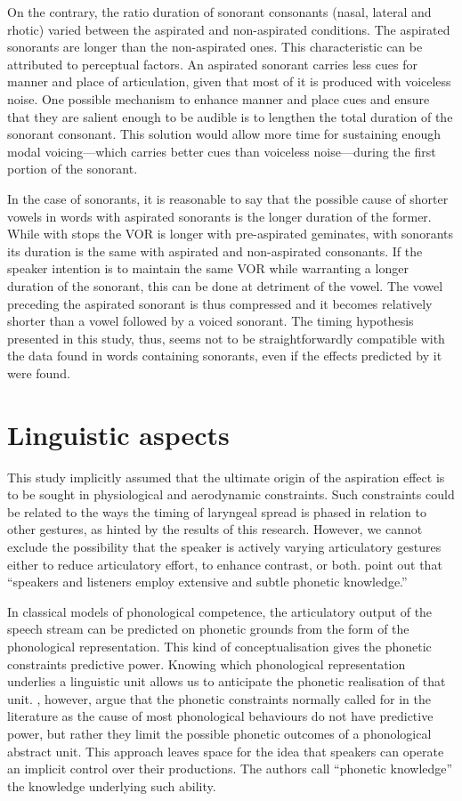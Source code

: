 \documentclass[11pt,a4paper,openany]{memoir}\usepackage[]{graphicx}\usepackage[]{color}
\begin{document}
On the contrary, the ratio duration of sonorant consonants (nasal, lateral and rhotic) varied between the aspirated and non-aspirated conditions.
The aspirated sonorants are longer than the non-aspirated ones.
This characteristic can be attributed to perceptual factors.
An aspirated sonorant carries less cues for manner and place of articulation, given that most of it is produced with voiceless noise.
One possible mechanism to enhance manner and place cues and ensure that they are salient enough to be audible is to lengthen the total duration of the sonorant consonant.
This solution would allow more time for sustaining enough modal voicing---which carries better cues than voiceless noise---during the first portion of the sonorant.

In the case of sonorants, it is reasonable to say that the possible cause of shorter vowels in words with aspirated sonorants is the longer duration of the former.
While with stops the VOR is longer with pre-aspirated geminates, with sonorants its duration is the same with aspirated and non-aspirated consonants.
If the speaker intention is to maintain the same VOR while warranting a longer duration of the sonorant, this can be done at detriment of the vowel.
The vowel preceding the aspirated sonorant is thus compressed and it becomes relatively shorter than a vowel followed by a voiced sonorant.
The timing hypothesis presented in this study, thus, seems not to be straightforwardly compatible with the data found in words containing sonorants, even if the effects predicted by it were found.

\section{Linguistic aspects}
This study implicitly assumed that the ultimate origin of the aspiration effect is to be sought in physiological and aerodynamic constraints.
Such constraints could be related to the ways the timing of laryngeal spread is phased in relation to other gestures, as hinted by the results of this research.
However, we cannot exclude the possibility that the speaker is actively varying articulatory gestures either to reduce articulatory effort, to enhance contrast, or both.
\citet[423]{kingston1994} point out that ``speakers and listeners employ extensive and subtle phonetic knowledge.''

In classical models of phonological competence, the articulatory output of the speech stream can be predicted on phonetic grounds from the form of the phonological representation.
This kind of conceptualisation gives the phonetic constraints predictive power.
Knowing which phonological representation underlies a linguistic unit allows us to anticipate the phonetic realisation of that unit. 
\citeauthor{kingston1994}, however, argue that the phonetic constraints normally called for in the literature as the cause of most phonological behaviours do not have predictive power, but rather they limit the possible phonetic outcomes of a phonological abstract unit.
This approach leaves space for the idea that speakers can operate an implicit control over their productions.
The authors call ``phonetic knowledge'' the knowledge underlying such ability.
\end{document}
